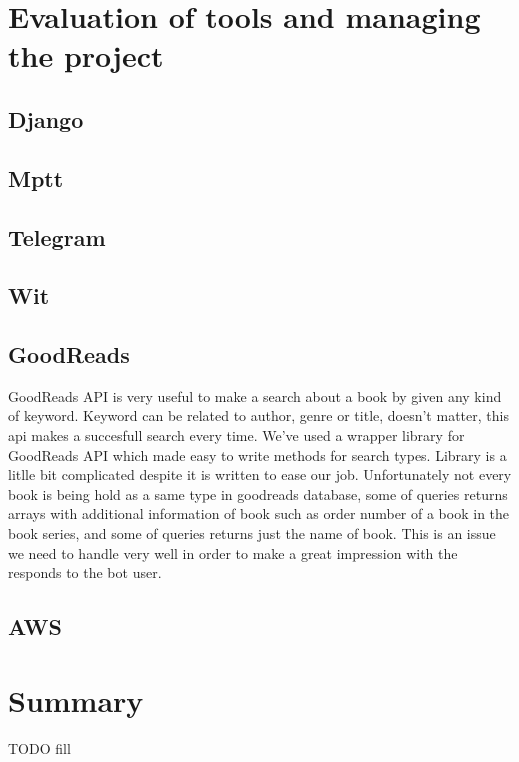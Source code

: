\documentclass[a4paper]{article}
\begin{document}
\section{Evaluation of tools and managing the project}
\subsection{Django}
\subsection{Mptt}
\subsection{Telegram}
\subsection{Wit}
\subsection{GoodReads}

\quad GoodReads API is very useful to make a search about a book by given any kind of keyword. Keyword can be related to author, genre or title, doesn't matter, this api makes a succesfull search every time. We've used a wrapper library for GoodReads API which made easy to write methods for search types. Library is a litlle bit complicated despite it is written to ease our job. Unfortunately not every book is being hold as a same type in goodreads database, some of queries returns arrays with additional information of book such as order number of a book in the book series, and some of queries returns just the name of book. This is an issue we need to handle very well in order to make a great impression with the responds to the bot user.  
\subsection{AWS}

\section{Summary}
TODO fill
\end{document}

